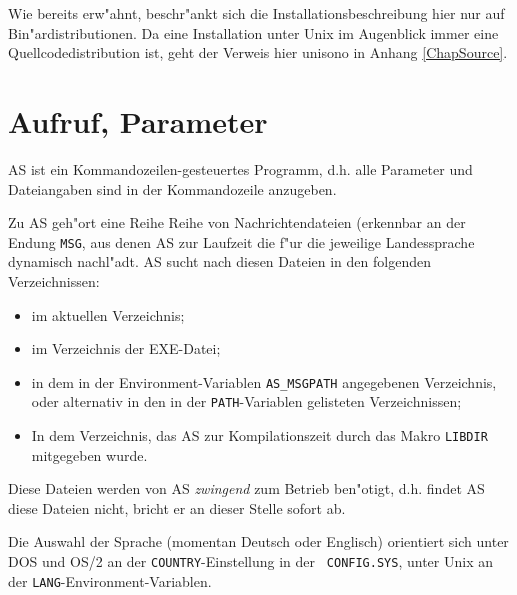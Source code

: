 \documentclass[12pt,a4paper,twoside]{report}
\newcommand{\asname}{AS}
\begin{document}
Wie bereits erw"ahnt, beschr"ankt sich die Installationsbeschreibung hier
nur auf Bin"ardistributionen.  Da eine Installation unter Unix
 im Augenblick immer eine Quellcodedistribution ist,
geht der Verweis hier unisono in Anhang \ref{ChapSource}.


\section{Aufruf, Parameter}\label{SectCallConvention}

\asname{} ist ein Kommandozeilen-gesteuertes Programm, d.h. alle Parameter
und Dateiangaben sind in der Kommandozeile anzugeben.

Zu \asname{} geh"ort eine Reihe Reihe von Nachrichtendateien (erkennbar an der
Endung {\tt MSG}, aus denen \asname{} zur Laufzeit die f"ur die jeweilige
Landessprache dynamisch nachl"adt.  \asname{} sucht nach diesen Dateien in den
folgenden Verzeichnissen:
\begin{itemize}
\item{im aktuellen Verzeichnis;}
\item{im Verzeichnis der EXE-Datei;}
\item{in dem in der Environment-Variablen {\tt AS\_MSGPATH} angegebenen
      Verzeichnis, oder alternativ in den in der {\tt PATH}-Variablen
      gelisteten Verzeichnissen;}
\item{In dem Verzeichnis, das \asname{} zur Kompilationszeit durch das
      Makro {\tt LIBDIR} mitgegeben wurde.}
\end{itemize}
Diese Dateien werden von \asname{} {\em zwingend} zum Betrieb ben"otigt, d.h.
findet \asname{} diese Dateien nicht, bricht er an dieser Stelle sofort ab.

Die Auswahl der Sprache (momentan Deutsch oder Englisch) orientiert sich
unter DOS und OS/2 an der {\tt COUNTRY}-Einstellung in der {\tt
CONFIG.SYS}, unter Unix an der {\tt LANG}-Environment-Variablen.
\end{document}
